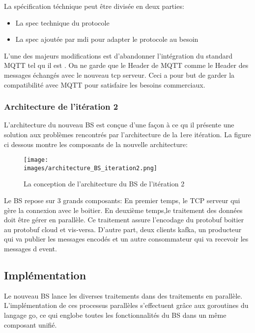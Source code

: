         La spécification téchnique peut être divisée en deux parties:
        \begin{itemize}
            \renewcommand{\labelitemi}{$\bullet$}
            \item La spec technique du protocole
            \item La spec ajoutée par \gls{mdi} pour adapter le protocole au besoin
        \end{itemize}
        \bigskip
        L’une des majeurs modifications est d'abandonner l’intégration du standard MQTT 
        tel qu il est . On ne garde que le Header de MQTT comme le Header des messages 
        échangés avec le nouveau tcp serveur. Ceci a pour but de garder la compatibilité 
        avec MQTT pour satisfaire les besoins commerciaux. 

        \subsubsection{Architecture de l'itération 2 }
            L’architecture du nouveau BS est conçue d’une façon à ce qu il présente 
            une solution aux problèmes rencontrés par l’architecture de la 1ere itération. 
            La figure ci dessous montre les composants de la nouvelle architecture:  \\
            \begin{figure}[ht]
                \centering
                \texttt{[image: \\images/architecture\_BS\_iteration2.png]}
                \caption{La conception de l'architecture du BS de l'itération 2}
                \label{Figure }
            \end{figure}
        
       
            Le BS  repose sur 3 grands composants: 
            En premier temps, le TCP serveur qui gère la connexion avec le boitier. 
            En deuxième temps,le traitement des données doit être gérer en parallèle. 
            Ce traitement assure l’encodage du protobuf boitier au protobuf cloud et 
            vis-versa. 
            D’autre part, deux clients kafka, un producteur qui va publier les messages 
            encodés et un autre consommateur qui va recevoir les messages d event. 

            \subsection{Implémentation}
            Le nouveau BS lance les diverses traitements dans des traitements en 
            parallèle. L’implémentation de ces processus parallèles s’effectuent grâce 
            aux goroutines du langage go, ce qui englobe toutes les fonctionnalités du BS 
            dans un même composant unifié.

